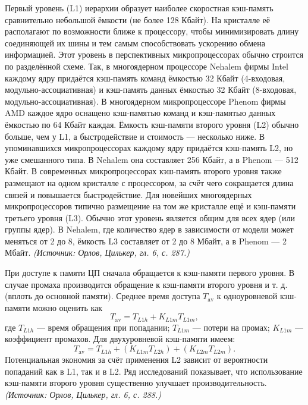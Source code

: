 \documentclass[a4paper,12pt]{article}
\begin{document}
Первый уровень (L1) иерархии образует наиболее скоростная кэш-память сравнительно небольшой ёмкости (не более 128 Кбайт). На кристалле её располагают по возможности ближе к процессору, чтобы минимизировать длину соединяющей их шины и тем самым способствовать ускорению обмена информацией. Этот уровень в перспективных микропроцессорах обычно строится по разделённой схеме. Так, в многоядерном процессоре Nehalem фирмы Intel каждому ядру придаётся кэш-память команд ёмкостью 32 Кбайт (4-входовая, модульно-ассоциативная) и кэш-память данных ёмкостью 32 Кбайт (8-входовая, модульно-ассоциативная). В многоядерном микропроцессоре Phenom фирмы AMD каждое ядро оснащено кэш-памятью команд и кэш-памятью данных ёмкостью по 64 Кбайт каждая. Ёмкость кэш-памяти второго уровня (L2) обычно больше, чем у L1, а быстродействие и стоимость --- несколько ниже. В упоминавшихся микропроцессорах каждому ядру придаётся кэш-память L2, но уже смешанного типа. В Nehalem она составляет 256 Кбайт, а в Phenom --- 512 Кбайт. В современных микропроцессорах кэш-память второго уровня также размещают на одном кристалле с процессором, за счёт чего сокращается длина связей и повышается быстродействие. Для новейших многоядерных микропроцессоров типично размещение на том же кристалле ещё и кэш-памяти третьего уровня (L3). Обычно этот уровень является общим для всех ядер (или группы ядер). В Nehalem, где количество ядер в зависимости от модели может меняться от 2 до 8, ёмкость L3 составляет от 2 до 8 Мбайт, а в Phenom --- 2 Мбайт.
\textit{(Источник: Орлов, Цилькер, гл. 6, с. 287.)}

При доступе к памяти ЦП сначала обращается к кэш-памяти первого уровня. В случае промаха производится обращение к кэш-памяти второго уровня и т. д. (вплоть до основной памяти). Среднее время доступа \(T_{\text{av}}\) к одноуровневой кэш-памяти можно оценить как
\[
T_{\text{av}}=T_{L1h}+K_{L1m}T_{L1m},
\]
где \(T_{L1h}\) --- время обращения при попадании; \(T_{L1m}\) --- потери на промах; \(K_{L1m}\) --- коэффициент промахов. Для двухуровневой кэш-памяти имеем:
\[
T_{\text{av}}=T_{L1h}+(K_{L1m}T_{L2h})+(K_{L2m}T_{L2m}).
\]
Потенциальная экономия за счёт применения L2 зависит от вероятности попаданий как в L1, так и в L2. Ряд исследований показывает, что использование кэш-памяти второго уровня существенно улучшает производительность.
\textit{(Источник: Орлов, Цилькер, гл. 6, с. 288.)}
\end{document}
